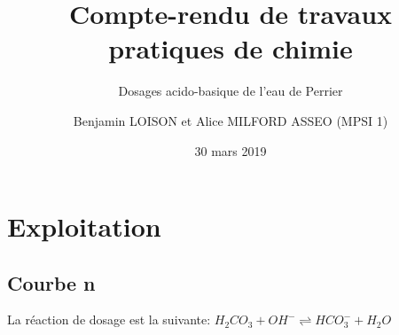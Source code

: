 \documentclass{scrartcl}
\begin{document}
	\title{\vspace{-2cm}Compte-rendu de travaux pratiques de chimie}
	\subtitle{Dosages acido-basique de l'eau de Perrier}
	\author{Benjamin LOISON et Alice MILFORD ASSEO (MPSI 1)}
	\date{30 mars 2019}
	\maketitle

  \setcounter{section}{1}
	\section{Exploitation}
		\subsection{Courbe n}
		
			La réaction de dosage est la suivante: $H_2CO_3 + OH^- \rightleftharpoons HCO_3^- + H_2O$\\
			
\end{document}
